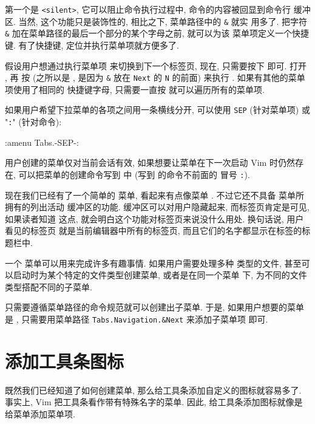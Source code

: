 第一个是 \texttt{<silent>}, 它可以阻止命令执行过程中, 命令的内容被回显到命令行
缓冲区. 当然, 这个功能只是装饰性的, 相比之下, 菜单路径中的 \verb'&' 就实
用多了. 把字符 \verb'&' 加在菜单路径的最后一个部分的某个字母之前, 就可以为该
菜单项定义一个快捷键. 有了快捷键, 定位并执行菜单项就方便多了.
\begin{center}
\end{center}
假设用户想通过执行菜单项  来切换到下一个标签页, 现在,
只需要按下  即可.  打开 , 再
按  (之所以是 , 是因为 \verb'&' 放在 \texttt{Next} 的
\texttt{N} 的前面) 来执行 . 如果有其他的菜单项使用了相同的
快捷键字母, 只需要一直按  就可以遍历所有的菜单项.
\begin{warning}
    如果用户希望下拉菜单的各项之间用一条横线分开, 可以使用 \texttt{SEP} 
    (针对菜单项) 或 "\texttt{:}" (针对命令):
\begin{vimcmd}
:amenu Tabs.-SEP-:
\end{vimcmd}
用户创建的菜单仅对当前会话有效, 如果想要让菜单在下一次启动 Vim 时仍然存在,
可以把菜单的创建命令写到  中 (写到  的命令不前面的
冒号 \texttt{:}).
\end{warning}
现在我们已经有了一个简单的  菜单, 看起来有点像菜单
. 不过它还不具备  菜单所拥有的列出活动
缓冲区的功能. 缓冲区可以对用户隐藏起来, 而标签页肯定是可见, 如果读者知道
这点, 就会明白这个功能对标签页来说没什么用处. 换句话说, 用户看见的标签页
就是当前编辑器中所有的标签页, 而且它们的名字都显示在标签的标题栏中.

一个  菜单可以用来完成许多有趣事情. 如果用户需要处理多种
类型的文件, 甚至可以启动时为某个特定的文件类型创建菜单, 或者是在同一个菜单
下, 为不同的文件类型搭配不同的子菜单.

只需要遵循菜单路径的命令规范就可以创建出子菜单. 于是, 如果用户想要的菜单是
, 只需要用菜单路径
\texttt{Tabs.Navigation.\&Next} 来添加子菜单项  即可.

\section{添加工具条图标}
\label{sec:adding_toolbar_icons}

既然我们已经知道了如何创建菜单, 那么给工具条添加自定义的图标就容易多了.
事实上, Vim 把工具条看作带有特殊名字的菜单. 因此, 给工具条添加图标就像是
给菜单添加菜单项.

